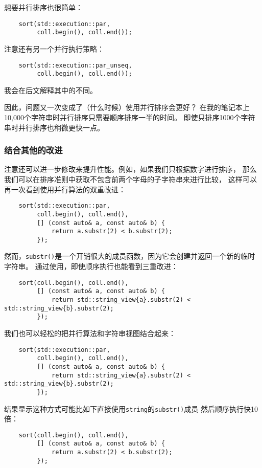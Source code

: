 想要并行排序也很简单：
\begin{lstlisting}
    sort(std::execution::par,
         coll.begin(), coll.end());
\end{lstlisting}
注意还有另一个并行执行策略：
\begin{lstlisting}
    sort(std::execution::par_unseq,
         coll.begin(), coll.end());
\end{lstlisting}
我会在后文解释其中的不同。

因此，问题又一次变成了（什么时候）使用并行排序会更好？
在我的笔记本上10,000个字符串时并行排序只需要顺序排序一半的时间。
即使只排序1000个字符串时并行排序也稍微更快一点。

\subsubsection{结合其他的改进}\label{ch22.1.2.1}
注意还可以进一步修改来提升性能。例如，如果我们只根据数字进行排序，
那么我们可以在排序准则中获取不包含前两个字母的子字符串来进行比较，
这样可以再一次看到使用并行算法的双重改进：
\begin{lstlisting}
    sort(std::execution::par,
         coll.begin(), coll.end(),
         [] (const auto& a, const auto& b) {
             return a.substr(2) < b.substr(2);
         });
\end{lstlisting}
然而，\texttt{substr()}是一个开销很大的成员函数，因为它会创建并返回一个新的临时字符串。
通过使用，即使顺序执行也能看到三重改进：
\begin{lstlisting}
    sort(coll.begin(), coll.end(),
         [] (const auto& a, const auto& b) {
             return std::string_view{a}.substr(2) < std::string_view{b}.substr(2);
         });
\end{lstlisting}
我们也可以轻松的把并行算法和字符串视图结合起来：
\begin{lstlisting}
    sort(std::execution::par,
         coll.begin(), coll.end(),
         [] (const auto& a, const auto& b) {
             return std::string_view{a}.substr(2) < std::string_view{b}.substr(2);
         });
\end{lstlisting}
结果显示这种方式可能比如下直接使用\texttt{string}的\texttt{substr()}成员
然后顺序执行快10倍：
\begin{lstlisting}
    sort(coll.begin(), coll.end(),
         [] (const auto& a, const auto& b) {
             return a.substr(2) < b.substr(2);
         });
\end{lstlisting}


